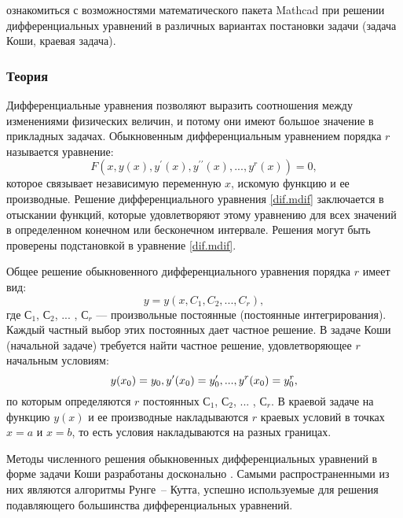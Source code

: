 
\goal ознакомиться с возможностями математического пакета Mathcad при решении дифференциальных уравнений в различных вариантах постановки задачи (задача Коши, краевая задача).

\subsubsection*{Теория}

Дифференциальные уравнения позволяют выразить соотношения между изменениями физических величин, и потому они имеют большое значение в прикладных задачах. Обыкновенным дифференциальным уравнением порядка $r$ называется уравнение:
\begin{equation} \label{dif.mdif}
F(x,y(x),y^\prime(x),y^{\prime \prime}(x), ... , y^r(x))=0,
\end{equation}
которое связывает независимую переменную $x$, искомую функцию и ее производные. Решение дифференциального уравнения \ref{dif.mdif} заключается в отыскании функций, которые удовлетворяют этому уравнению для всех значений в определенном конечном или бесконечном интервале. Решения могут быть проверены подстановкой в уравнение \ref{dif.mdif}.

Общее решение обыкновенного дифференциального уравнения порядка $r$ имеет вид:
\begin{equation}
y=y(x,C_1,C_2, ... ,C_r),
\end{equation}
где $С_1$, $С_2$, ... , $С_r$ --- произвольные постоянные (постоянные интегрирования). Каждый частный выбор этих постоянных дает частное решение. В задаче Коши (начальной задаче) требуется найти частное решение, удовлетворяющее $r$ начальным условиям:
\begin{equation}
y(x_0)=y_0, \newline
y^{\prime}(x_0)=y_0^{\prime}, ... , y^{r}(x_0)=y^r_0,
\end{equation}
по которым определяются $r$ постоянных $С_1$, $С_2$, ... , $С_r$. В краевой задаче на функцию $y(x)$ и ее производные накладываются $r$ краевых условий в точках $x=a$ и $x=b$, то есть условия накладываются на разных границах.

Методы численного решения обыкновенных дифференциальных уравнений в форме задачи Коши разработаны досконально \cite{shipachevvs2005}. Самыми распространенными из них являются алгоритмы Рунге~-- Кутта, успешно используемые для решения подавляющего большинства дифференциальных уравнений. 

